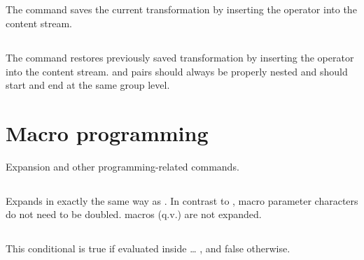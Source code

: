 \documentclass{pdftexmanual}
\begin{document}
\subsection{}

The command saves the current transformation by inserting the 
operator into the content stream. 

\subsection{}

The command restores previously saved transformation by inserting the
 operator into the content stream.  and
 pairs should always be properly nested and should start
and end at the same group level. 

\section{Macro programming}

Expansion and other programming-related commands.

\subsection{}

Expands  in exactly the same way as . In
contrast to , macro parameter characters do not need to be
doubled.  macros (q.v.) are not expanded.

\subsection{}

This conditional is true if evaluated inside  \ldots
{}, and false otherwise.

\subsection{}
\end{document}
